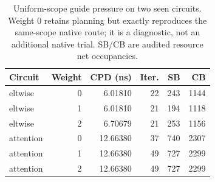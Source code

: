 \begin{table}[t]
\centering
\caption{Uniform-scope guide pressure on two seen circuits. Weight 0 retains planning but exactly reproduces the same-scope native route; it is a diagnostic, not an additional native trial. SB/CB are audited resource net occupancies.}
\label{tab:guide-pressure}
\begin{tabular}{lrrrrr}
\hline
Circuit & Weight & CPD (ns) & Iter. & SB & CB \\
\hline
eltwise & 0 & 6.01810 & 22 & 243 & 1144 \\
eltwise & 1 & 6.01810 & 21 & 194 & 1118 \\
eltwise & 2 & 6.70679 & 21 & 253 & 1156 \\
attention & 0 & 12.66380 & 37 & 740 & 2307 \\
attention & 1 & 12.66380 & 49 & 727 & 2299 \\
attention & 2 & 12.66380 & 49 & 727 & 2299 \\
\hline
\end{tabular}
\end{table}

